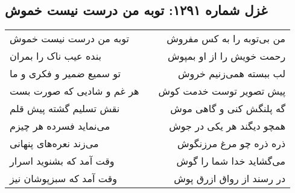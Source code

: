 \begin{center}
\section*{غزل شماره ۱۲۹۱: توبه من درست نیست خموش}
\label{sec:1291}
\begin{longtable}{l p{0.5cm} r}
توبه من درست نیست خموش
&&
من بی‌توبه را به کس مفروش
\\
بنده عیب ناک را بمران
&&
رحمت خویش را از او بمپوش
\\
تو سمیع ضمیر و فکری و ما
&&
لب ببسته همی‌زنیم خروش
\\
هر غم و شادیی که صورت بست
&&
پیش تصویر توست خدمت کوش
\\
نقش تسلیم گشته پیش قلم
&&
گه پلنگش کنی و گاهی موش
\\
می‌نماید فسرده هر چیزم
&&
همچو دیگند هر یکی در جوش
\\
می‌زند نعره‌های پنهانی
&&
ذره ذره چو مرغ مرزنگوش
\\
وقت آمد که بشنوید اسرار
&&
می‌گشاید خدا شما را گوش
\\
وقت آمد که سبزپوشان نیز
&&
در رسند از رواق ازرق پوش
\\
\end{longtable}
\end{center}
